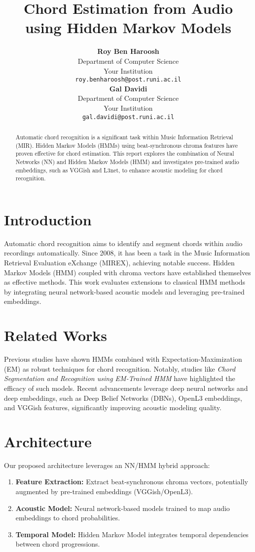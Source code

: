 \documentclass{article}
\title{Chord Estimation from Audio using Hidden Markov Models}
\author{
\textbf{Roy Ben Haroosh}\\
Department of Computer Science\\
Your Institution\\
\texttt{roy.benharoosh@post.runi.ac.il}\\
\textbf{Gal Davidi}\\
Department of Computer Science\\
Your Institution\\
\texttt{gal.davidi@post.runi.ac.il}}
\begin{document}
\maketitle

\begin{abstract}
Automatic chord recognition is a significant task within Music Information Retrieval (MIR). Hidden Markov Models (HMMs) using beat-synchronous chroma features have proven effective for chord estimation. This report explores the combination of Neural Networks (NN) and Hidden Markov Models (HMM) and investigates pre-trained audio embeddings, such as VGGish and L3net, to enhance acoustic modeling for chord recognition.
\end{abstract}

\section{Introduction}
Automatic chord recognition aims to identify and segment chords within audio recordings automatically. Since 2008, it has been a task in the Music Information Retrieval Evaluation eXchange (MIREX), achieving notable success. Hidden Markov Models (HMM) coupled with chroma vectors have established themselves as effective methods. This work evaluates extensions to classical HMM methods by integrating neural network-based acoustic models and leveraging pre-trained embeddings.

\section{Related Works}
Previous studies have shown HMMs combined with Expectation-Maximization (EM) as robust techniques for chord recognition. Notably, studies like \textit{Chord Segmentation and Recognition using EM-Trained HMM} have highlighted the efficacy of such models. Recent advancements leverage deep neural networks and deep embeddings, such as Deep Belief Networks (DBNs), OpenL3 embeddings, and VGGish features, significantly improving acoustic modeling quality.

\section{Architecture}
Our proposed architecture leverages an NN/HMM hybrid approach:
\begin{enumerate}
    \item \textbf{Feature Extraction:} Extract beat-synchronous chroma vectors, potentially augmented by pre-trained embeddings (VGGish/OpenL3).
    \item \textbf{Acoustic Model:} Neural network-based models trained to map audio embeddings to chord probabilities.
    \item \textbf{Temporal Model:} Hidden Markov Model integrates temporal dependencies between chord progressions.
\end{enumerate}
\end{document}
